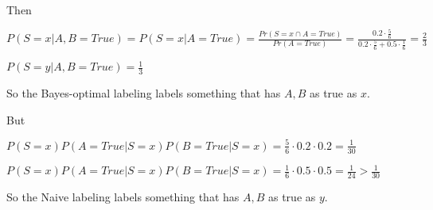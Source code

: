 \documentclass[]{article}
\begin{document}
Then

$P(S=x|A,B=True) = P(S=x|A=True) = \frac{Pr(S=x \cap A=True)}{Pr(A=True)} = \frac{0.2 \cdot \frac{5}{6}}{0.2 \cdot \frac{5}{6} + 0.5 \cdot \frac{1}{6}} = \frac{2}{3}$

$P(S=y|A,B=True) = \frac{1}{3}$

So the Bayes-optimal labeling labels something that has $A,B$ as true as $x$.

But

$P(S=x)P(A=True|S=x)P(B=True|S=x) = \frac{5}{6} \cdot 0.2 \cdot 0.2 = \frac{1}{30}$

$P(S=x)P(A=True|S=x)P(B=True|S=x) = \frac{1}{6} \cdot 0.5 \cdot 0.5 = \frac{1}{24} > \frac{1}{30}$

So the Naive labeling labels something that has $A,B$ as true as $y$.
\end{document}
